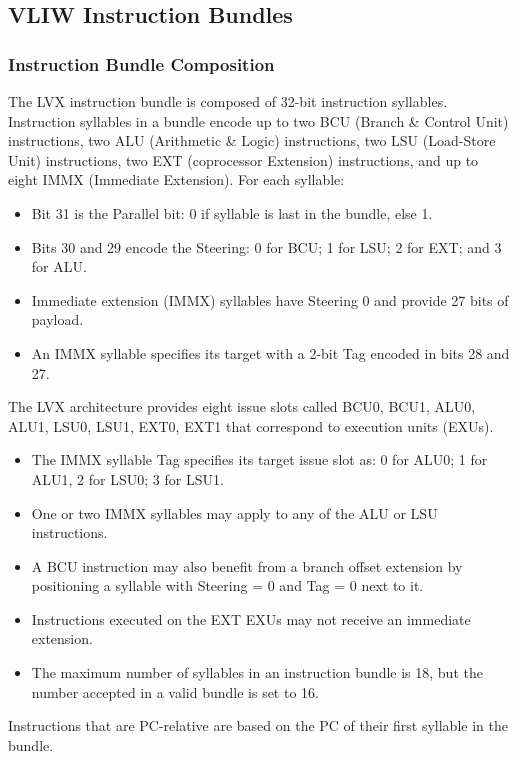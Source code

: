 \subsection{VLIW Instruction Bundles}

\subsubsection{Instruction Bundle Composition}

The LVX instruction bundle is composed of 32-bit instruction syllables. Instruction syllables in a bundle encode up to two BCU (Branch \& Control Unit) instructions, two ALU (Arithmetic \& Logic) instructions, two LSU (Load-Store Unit) instructions, two EXT (coprocessor Extension) instructions, and up to eight IMMX (Immediate Extension).
For each syllable: \begin{itemize}
\item Bit 31 is the Parallel bit: 0 if syllable is last in the bundle, else 1.
\item Bits 30 and 29 encode the Steering: 0 for BCU; 1 for LSU; 2 for EXT; and 3 for ALU.
\item Immediate extension (IMMX) syllables have Steering 0 and provide 27 bits of payload.
\item An IMMX  syllable specifies its target with a 2-bit Tag encoded in bits 28 and 27.
\end{itemize}

The LVX architecture provides eight issue slots called BCU0, BCU1, ALU0, ALU1, LSU0, LSU1, EXT0, EXT1 that correspond to execution units (EXUs).
\begin{itemize}
\item The IMMX syllable Tag specifies its target issue slot as: 0 for ALU0; 1 for ALU1, 2 for LSU0; 3 for LSU1.
\item One or two IMMX syllables may apply to any of the ALU or LSU instructions.
\item A BCU instruction may also benefit from a branch offset extension by positioning a syllable with Steering = 0 and Tag = 0 next to it.
\item Instructions executed on the EXT EXUs may not receive an immediate extension.
\item The maximum number of syllables in an instruction bundle is 18, but the number accepted in a valid bundle is set to 16.
\end{itemize}

Instructions that are PC-relative are based on the PC of their first syllable in the bundle.

